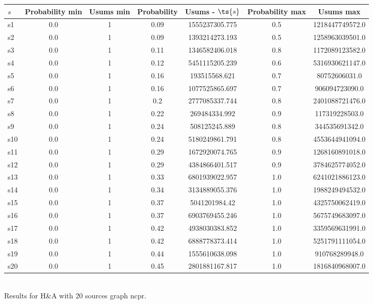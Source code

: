\documentclass{article}
\begin{document}
\noindent\begin{tabular}{|l|c|c|c|c|c|c|}
\hline
$s$& Probability min & Usums min & Probability & Usums - $\ts{s}$ & Probability max & Usums max\\
\hline
s1 &0.0 & 1 & 0.09 & 1555237305.775 & 0.5 & 1218447749572.0\\
\hline
s2 &0.0 & 1 & 0.09 & 1393214273.193 & 0.5 & 1258963039501.0\\
\hline
s3 &0.0 & 1 & 0.11 & 1346582406.018 & 0.8 & 1172089123582.0\\
\hline
s4 &0.0 & 1 & 0.12 & 5451115205.239 & 0.6 & 5316930621147.0\\
\hline
s5 &0.0 & 1 & 0.16 & 193515568.621 & 0.7 & 80752606031.0\\
\hline
s6 &0.0 & 1 & 0.16 & 1077525865.697 & 0.7 & 906094723090.0\\
\hline
s7 &0.0 & 1 & 0.2 & 2777085337.744 & 0.8 & 2401088721476.0\\
\hline
s8 &0.0 & 1 & 0.22 & 269484334.992 & 0.9 & 117319228503.0\\
\hline
s9 &0.0 & 1 & 0.24 & 508125245.889 & 0.8 & 344535691342.0\\
\hline
s10 &0.0 & 1 & 0.24 & 5180249861.791 & 0.8 & 4553644941094.0\\
\hline
s11 &0.0 & 1 & 0.29 & 1672920074.765 & 0.9 & 1268160891018.0\\
\hline
s12 &0.0 & 1 & 0.29 & 4384866401.517 & 0.9 & 3784625774052.0\\
\hline
s13 &0.0 & 1 & 0.33 & 6801939022.957 & 1.0 & 6241021886123.0\\
\hline
s14 &0.0 & 1 & 0.34 & 3134889055.376 & 1.0 & 1988249494532.0\\
\hline
s15 &0.0 & 1 & 0.37 & 5041201984.42 & 1.0 & 4325750062419.0\\
\hline
s16 &0.0 & 1 & 0.37 & 6903769455.246 & 1.0 & 5675749683097.0\\
\hline
s17 &0.0 & 1 & 0.42 & 4938030383.852 & 1.0 & 3359569631991.0\\
\hline
s18 &0.0 & 1 & 0.42 & 6888778373.414 & 1.0 & 5251791111054.0\\
\hline
s19 &0.0 & 1 & 0.44 & 1555610638.098 & 1.0 & 910768289948.0\\
\hline
s20 &0.0 & 1 & 0.45 & 2801881167.817 & 1.0 & 1816840968007.0\\
\hline
\end{tabular}\\

\noindent Results for H\&A with 20 sources graph ncpr.
\end{document}
